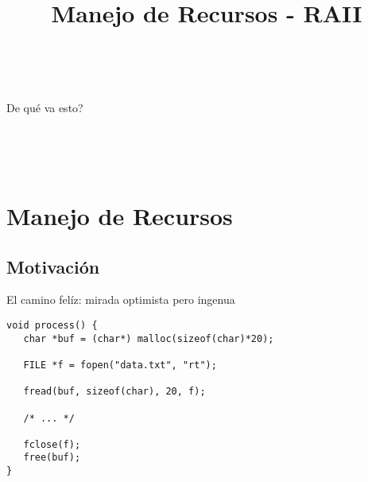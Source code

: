 

\title%
{Manejo de Recursos - RAII}


\subject{Manejo de Recursos - RAII}




\begin{frame}
   \titlepage
\end{frame}

~%
\begin{frame}{De qu\'e va esto?}
   \tableofcontents
\end{frame}
~%


~%
\section{Manejo de Recursos}
\subsection{Motivaci\'on}
\begin{frame}[fragile]{El camino fel\'iz: mirada optimista pero ingenua}
   \begin{lstlisting}[style=normal]
void process() {
   char *buf = (char*) malloc(sizeof(char)*20);

   FILE *f = fopen("data.txt", "rt");

   fread(buf, sizeof(char), 20, f);

   /* ... */

   fclose(f);
   free(buf);
}
   \end{lstlisting}
\end{frame}

